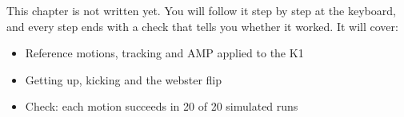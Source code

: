 \label{k:train}
\begin{keyidea}
This chapter is not written yet. You will follow it step by step at the keyboard, and every step ends with a check that tells you whether it worked. It will cover:
\begin{itemize}[nosep]
  \item Reference motions, tracking and AMP applied to the K1
  \item Getting up, kicking and the webster flip
  \item Check: each motion succeeds in 20 of 20 simulated runs
\end{itemize}
\end{keyidea}
